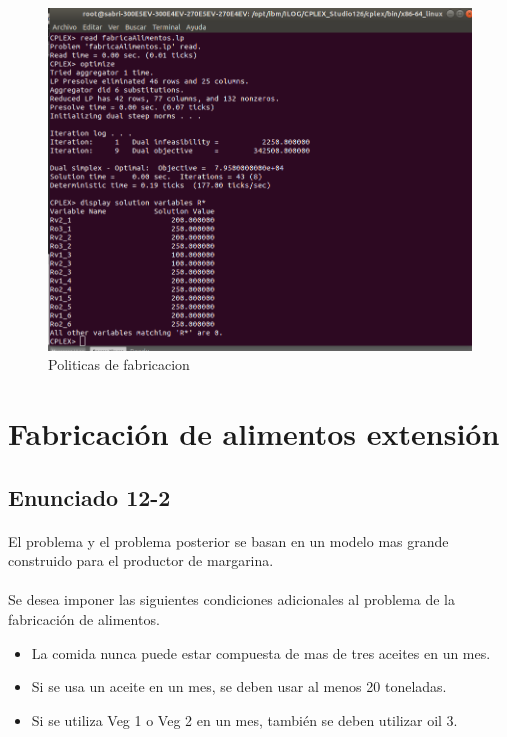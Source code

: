 \begin{figure}[!h]
    \centering
    \includegraphics[scale=0.35]{modelos/fabricaAlimentos12-1Fabricacion.png}
    \caption{Politicas de fabricacion}
\end{figure}


\section{Fabricación de alimentos extensión}
\subsection{Enunciado 12-2}
\paragraph{}El problema y el problema posterior se basan en un modelo mas grande construido para el productor de margarina.
\paragraph{}Se desea imponer las siguientes condiciones adicionales al problema de la fabricación de alimentos.
\begin{itemize}
\item La comida nunca puede estar compuesta de mas de tres aceites en un mes.
\item Si se usa un aceite en un mes, se deben usar al menos 20 toneladas.
\item Si se utiliza Veg 1 o Veg 2 en un mes, también se deben utilizar oil 3.
\end{itemize}
